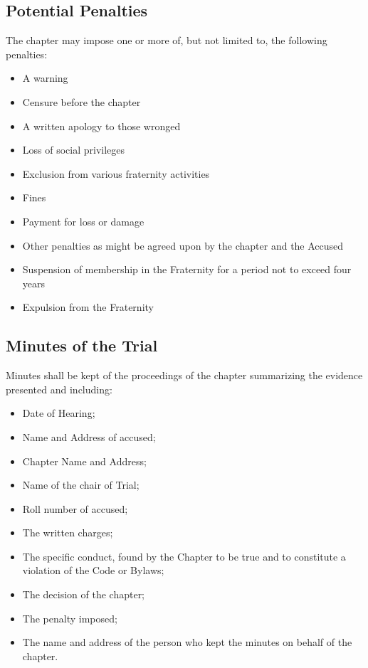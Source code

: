 \subsection{Potential Penalties}

The chapter may impose one or more of, but not limited to, the following
penalties:
\begin{itemize}
    \item A warning
    \item Censure before the chapter
    \item A written apology to those wronged
    \item Loss of social privileges
    \item Exclusion from various fraternity activities
    \item Fines
    \item Payment for loss or damage
    \item Other penalties as might be agreed upon by the chapter and the
        Accused
    \item Suspension of membership in the Fraternity for a period not to exceed
        four years
    \item Expulsion from the Fraternity
\end{itemize}

\subsection{Minutes of the Trial}

Minutes shall be kept of the proceedings of the chapter summarizing the
evidence presented and including:
\begin{itemize}
    \item Date of Hearing;
    \item Name and Address of accused;
    \item Chapter Name and Address;
    \item Name of the chair of Trial;
    \item Roll number of accused;
    \item The written charges;
    \item The specific conduct, found by the Chapter to be true and to
        constitute a violation of the Code or Bylaws;
    \item The decision of the chapter;
    \item The penalty imposed;
    \item The name and address of the person who kept the minutes on behalf of the
    chapter.
\end{itemize}

